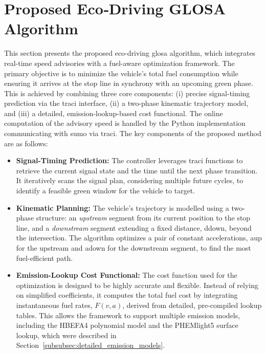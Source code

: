 \section{Proposed Eco‐Driving GLOSA Algorithm}
\label{sec:Proposed_Eco_Driving_GLOSA_Algorithm}

This section presents the proposed eco-driving \ac{glosa} algorithm, which integrates real-time speed advisories with a fuel-aware optimization framework. The primary objective is to minimize the vehicle's total fuel consumption while ensuring it arrives at the stop line in synchrony with an upcoming green phase. This is achieved by combining three core components: (i) precise signal-timing prediction via the \ac{traci} interface, (ii) a two-phase kinematic trajectory model, and (iii) a detailed, emission-lookup-based cost functional. The online computation of the advisory speed is handled by the Python implementation communicating with \ac{sumo} via \ac{traci}.
\mynewline
The key components of the proposed method are as follows:
\begin{itemize}
    \item \textbf{Signal-Timing Prediction:} The controller leverages \ac{traci} functions to retrieve the current signal state and the time until the next phase transition. It iteratively scans the signal plan, considering multiple future cycles, to identify a feasible green window for the vehicle to target.

    \item \textbf{Kinematic Planning:} The vehicle's trajectory is modelled using a two-phase structure: an \emph{upstream} segment from its current position to the stop line, and a \emph{downstream} segment extending a fixed distance, \gls{ddown}, beyond the intersection. The algorithm optimizes a pair of constant accelerations, \gls{aup} for the upstream and \gls{adown} for the downstream segment, to find the most fuel-efficient path.

    \item \textbf{Emission-Lookup Cost Functional:} The cost function used for the optimization is designed to be highly accurate and flexible. Instead of relying on simplified coefficients, it computes the total fuel cost by integrating instantaneous fuel rates, $F(v,a)$, derived from detailed, pre-compiled lookup tables. This allows the framework to support multiple emission models, including the HBEFA4 polynomial model and the PHEMlight5 surface lookup, which were described in Section~\vref{subsubsec:detailed_emission_models}.
\end{itemize}

